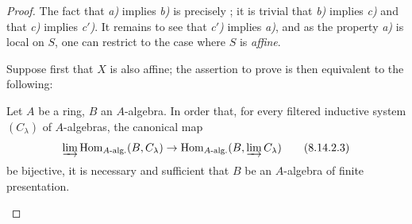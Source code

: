 \begin{proof}
The fact that \emph{a)} implies \emph{b)} is precisely ; it is trivial that \emph{b)} implies \emph{c)} and that \emph{c)} implies \emph{c$'$)}.
It remains to see that \emph{c$'$)} implies \emph{a)}, and as the property \emph{a)} is local on $S$, one can restrict to the case where $S$ is \emph{affine}.

Suppose first that $X$ is also affine; the assertion to prove is then equivalent to the following:

\begin{corollary}[8.14.2.2]
\label{IV.8.14.2.2}
Let $A$ be a ring, $B$ an $A$-algebra.
In order that, for every filtered inductive system $(C_\lambda)$ of $A$-algebras, the canonical map
\begin{equation}
\label{IV.8.14.2.3}
\varinjlim\operatorname{Hom}_{A\text{-}\mathrm{alg.}}(B,C_\lambda)\to\operatorname{Hom}_{A\text{-}\mathrm{alg.}}(B,\varinjlim C_\lambda) \tag{8.14.2.3}
\end{equation}
be bijective, it is necessary and sufficient that $B$ be an $A$-algebra of finite presentation.
\end{corollary}


\end{proof}
